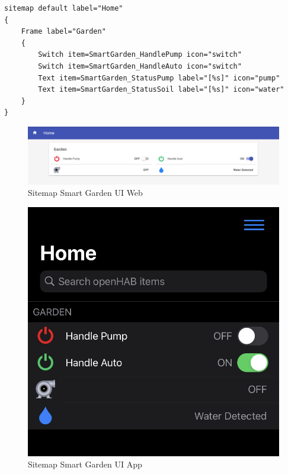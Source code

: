 \begin{lstlisting}[caption=Sitemap Smart Garden Code,label=code:sitemap_smart_garden_code]
sitemap default label="Home"
{
    Frame label="Garden" 
    {
        Switch item=SmartGarden_HandlePump icon="switch"
        Switch item=SmartGarden_HandleAuto icon="switch"
        Text item=SmartGarden_StatusPump label="[%s]" icon="pump"
        Text item=SmartGarden_StatusSoil label="[%s]" icon="water"
    }
}
\end{lstlisting}

\begin{figure}
    \centering
    \includegraphics[width=12cm]{Immagini/sitemap_smart_garden_ui_web}
    \caption{Sitemap Smart Garden UI Web}
    \label{fig:sitemap_smart_garden_ui_web}
\end{figure}

\begin{figure}
    \centering
    \includegraphics[width=12cm]{Immagini/sitemap_smart_garden_ui_app}
    \caption{Sitemap Smart Garden UI App}
    \label{fig:sitemap_smart_garden_ui_app}
\end{figure}
